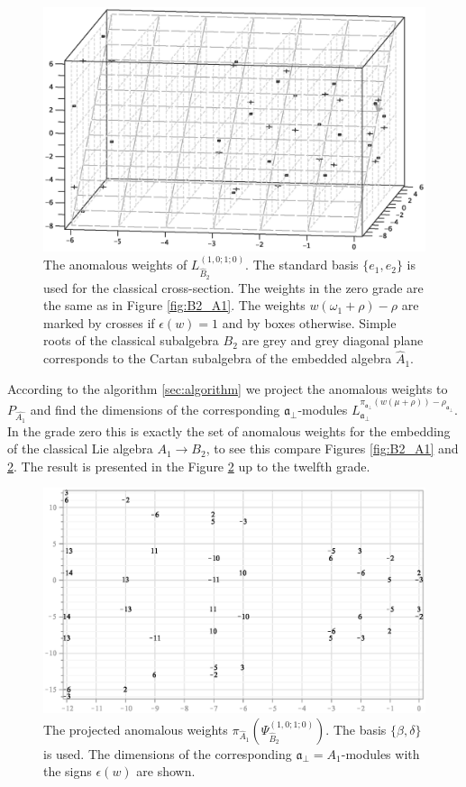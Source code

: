 \documentclass[12pt]{iopart}
\theoremstyle{definition}
\newcommand{\afb}{\mathfrak{a}_{\bot}}
\begin{document}
\begin{figure}[h!tb]
  \includegraphics[width=140mm]{figure11.eps}
  \caption{The anomalous weights of $L^{(1,0;1;0)}_{\hat B_2 }$. The standard basis $\{e_1,e_2\}$ is used for the classical cross-section. 
  The weights in the zero grade are the same as in Figure \ref{fig:B2_A1}.
  The weights $w (\omega_1+\rho)-\rho$ are marked by crosses if $\epsilon(w)=1$ and by boxes otherwise.
Simple roots of the classical subalgebra $B_2$ are grey and grey diagonal plane corresponds to the Cartan subalgebra
of the embedded algebra $\hat{A}_1$.}
  \label{fig:affine_B2_anom_point}
\end{figure}

According to the algorithm \ref{sec:algorithm} we project the anomalous weights to
$P_{\hat{A_1}}$ and find the dimensions of the corresponding
$\afb$-modules $L^{\pi_{\afb}(w(\mu+\rho))-\rho_{\afb}}_{\afb}$.
In the grade zero this is exactly the set of anomalous weights for the embedding of
the classical Lie algebra $A_1\rightarrow B_2$, to see this compare Figures \ref{fig:B2_A1}
and \ref{fig:AffineB2_A1_anom_proj}.
The result is presented in the Figure
\ref{fig:AffineB2_A1_anom_proj} up to the twelfth grade.
\begin{figure}[h!tb]
  \centering
  \includegraphics[width=120mm]{figure12.eps}
  \caption{The projected anomalous weights $\pi_{\hat A_1}\left(\Psi^{(1,0;1;0)}_{\hat B_2}\right)$. The basis $\{\beta,\delta\}$ is used. The dimensions of the corresponding $\afb=A_1$-modules with the signs $\epsilon(w)$ are shown.}
  \label{fig:AffineB2_A1_anom_proj}
\end{figure}
\end{document}
